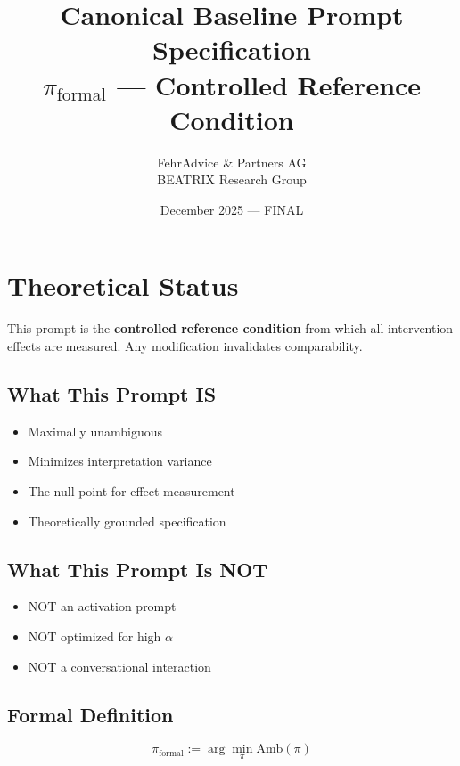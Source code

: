 \documentclass[11pt,a4paper]{article}
\title{\textbf{Canonical Baseline Prompt Specification}\\
\Large $\pi_{\text{formal}}$ --- Controlled Reference Condition}
\author{FehrAdvice \& Partners AG\\BEATRIX Research Group}
\date{December 2025 --- FINAL}
\begin{document}
\maketitle

\section{Theoretical Status}

\begin{warningbox}
This prompt is the \textbf{controlled reference condition} from which all intervention effects are measured. Any modification invalidates comparability.
\end{warningbox}

\subsection{What This Prompt IS}

\begin{itemize}
    \item[$\checkmark$] Maximally unambiguous
    \item[$\checkmark$] Minimizes interpretation variance
    \item[$\checkmark$] The null point for effect measurement
    \item[$\checkmark$] Theoretically grounded specification
\end{itemize}

\subsection{What This Prompt Is NOT}

\begin{itemize}
    \item[$\times$] NOT an activation prompt
    \item[$\times$] NOT optimized for high $\alpha$
    \item[$\times$] NOT a conversational interaction
\end{itemize}

\subsection{Formal Definition}

\begin{equation}
\pi_{\text{formal}} := \arg\min_{\pi} \text{Amb}(\pi)
\end{equation}
\end{document}
